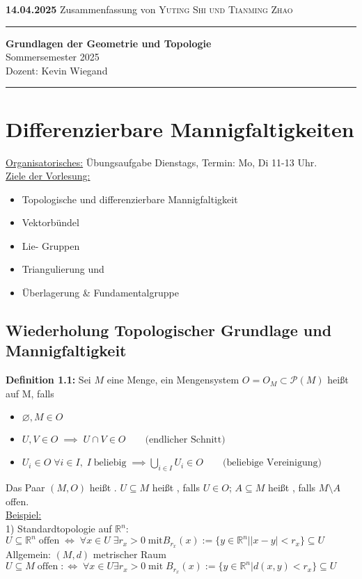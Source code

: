 \documentclass[fleqn, 12pt, letterpaper]{article}
\newcommand{\txt}[1]{\text{#1}}
\newcommand{\instinfo}[3]{
	\begin{large}
		\textbf{#2}\hspace{0.2cm}
		\textbf{#1}\hfill
		Zusammenfassung von \textsc{#3}
		\vspace{.1cm}
		\hrule
	\end{large}
}
\newcommand{\papheader}[3]{	
	\instinfo{}{#2}{#1}
	\vspace{0.5em}	
	\begin{center}
		\textbf{\large{Grundlagen der Geometrie und Topologie}}\\
		{\large{Sommersemester 2025}} \\
		\large{Dozent: #3}
		\vspace{1em}
		\hrule
	\end{center}
}
\begin{document}
\vspace*{-2.5cm}

\papheader{Yuting Shi und Tianming Zhao} %
{14.04.2025}           %
{Kevin Wiegand}        %

\section{Differenzierbare Mannigfaltigkeiten}

\underline{Organisatorisches:} Übungsaufgabe Dienstags, Termin: Mo, Di 11-13 Uhr.\\

\underline{Ziele der Vorlesung:}
\begin{itemize}
	\item Topologische und differenzierbare Mannigfaltigkeit
	\item Vektorbündel
	\item Lie- Gruppen
	\item Triangulierung und 
	\item Überlagerung \& Fundamentalgruppe
\end{itemize}
\subsection{Wiederholung Topologischer Grundlage und Mannigfaltigkeit}
\textbf{Definition 1.1:} Sei $M$ eine Menge, ein Mengensystem $O=O_M \subset \mathcal{P} (M)$ heißt  auf M, falls
\begin{itemize}
	\item $\varnothing, M\in O$
	\item $U,V\in O\;\implies \;U\cap V\in O\qquad \text{(endlicher Schnitt)}$
	\item $U_i\in O\;\forall i\in I,\;I\;\txt{beliebig}\;\implies \bigcup_{i\in I} U_i\in O \qquad \txt{(beliebige Vereinigung)}$
\end{itemize}
Das Paar $(M,O)$ heißt . $U\subseteq M$ heißt , falls $U\in O$; $A\subseteq M$ heißt , falls $M\setminus A$ offen.\\

\underline{Beispiel:}\\

1) Standardtopologie auf $\mathbb{R} ^n$: $U\subseteq \mathbb{R}^n \;\text{offen} \;\Leftrightarrow \;\forall x\in U \;\exists r_x>0 \;\text{mit} B_{r_x}(x):=\{y\in \mathbb{R}^n||x-y|<r_x\} \subseteq U$\\
Allgemein: $(M,d)$ metrischer Raum $U\subseteq M \; \text{offen} \;:\Leftrightarrow \; \forall x\in U \exists r_x>0 \; \text{mit}\;B_{r_x}(x):=\{y\in \mathbb{R}^n|d(x,y)<r_x\}\subseteq U$\\
\end{document}

